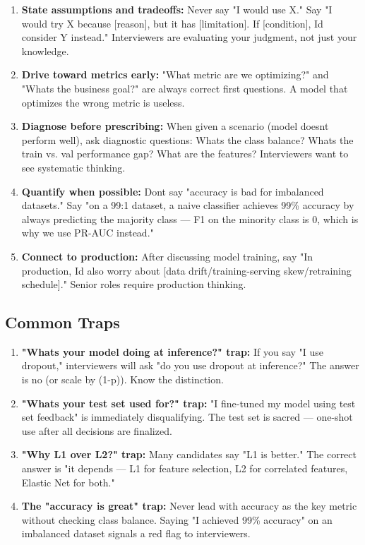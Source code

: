 \documentclass[11pt]{article}
\begin{document}
\begin{enumerate}
\def\labelenumi{\arabic{enumi}.}
\setcounter{enumi}{3}
\item
  \textbf{State assumptions and tradeoffs:} Never say "I would use X." Say "I would try X because {[}reason{]}, but it has {[}limitation{]}. If {[}condition{]}, I\textquotesingle d consider Y instead." Interviewers are evaluating your judgment, not just your knowledge.
\item
  \textbf{Drive toward metrics early:} "What metric are we optimizing?" and "What\textquotesingle s the business goal?" are always correct first questions. A model that optimizes the wrong metric is useless.
\item
  \textbf{Diagnose before prescribing:} When given a scenario (model doesn\textquotesingle t perform well), ask diagnostic questions: What\textquotesingle s the class balance? What\textquotesingle s the train vs. val performance gap? What are the features? Interviewers want to see systematic thinking.
\item
  \textbf{Quantify when possible:} Don\textquotesingle t say "accuracy is bad for imbalanced datasets." Say "on a 99:1 dataset, a naive classifier achieves 99\% accuracy by always predicting the majority class --- F1 on the minority class is 0, which is why we use PR-AUC instead."
\item
  \textbf{Connect to production:} After discussing model training, say "In production, I\textquotesingle d also worry about {[}data drift/training-serving skew/retraining schedule{]}." Senior roles require production thinking.
\end{enumerate}

\subsection{Common Traps}\label{common-traps}

\begin{enumerate}
\def\labelenumi{\arabic{enumi}.}
\setcounter{enumi}{8}
\item
  \textbf{"What\textquotesingle s your model doing at inference?" trap:} If you say "I use dropout," interviewers will ask "do you use dropout at inference?" The answer is no (or scale by (1-p)). Know the distinction.
\item
  \textbf{"What\textquotesingle s your test set used for?" trap:} "I fine-tuned my model using test set feedback" is immediately disqualifying. The test set is sacred --- one-shot use after all decisions are finalized.
\item
  \textbf{"Why L1 over L2?" trap:} Many candidates say "L1 is better." The correct answer is "it depends --- L1 for feature selection, L2 for correlated features, Elastic Net for both."
\item
  \textbf{The "accuracy is great" trap:} Never lead with accuracy as the key metric without checking class balance. Saying "I achieved 99\% accuracy" on an imbalanced dataset signals a red flag to interviewers.
\end{enumerate}
\end{document}
